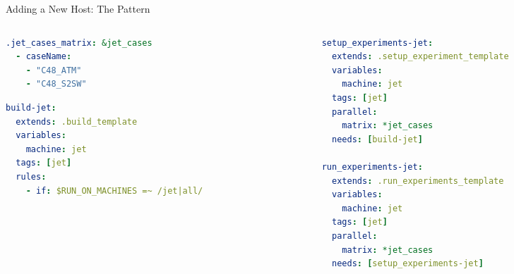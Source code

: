 \documentclass[aspectratio=169]{beamer}
\begin{document}
\begin{frame}[fragile]{Adding a New Host: The Pattern}

\begin{center}
\end{center}

\vspace{0.2cm}

\begin{columns}[T]
\begin{column}{0.48\textwidth}
\begin{lstlisting}[language=yaml,basicstyle=\ttfamily\tiny,title={\small Step 1: Define case matrix}]
.jet_cases_matrix: &jet_cases
  - caseName:
    - "C48_ATM"
    - "C48_S2SW"
\end{lstlisting}

\begin{lstlisting}[language=yaml,basicstyle=\ttfamily\tiny,title={\small Step 2: Add build job}]
build-jet:
  extends: .build_template
  variables:
    machine: jet
  tags: [jet]
  rules:
    - if: $RUN_ON_MACHINES =~ /jet|all/
\end{lstlisting}
\end{column}

\begin{column}{0.48\textwidth}
\begin{lstlisting}[language=yaml,basicstyle=\ttfamily\tiny,title={\small Step 3: Add setup/run jobs}]
setup_experiments-jet:
  extends: .setup_experiment_template
  variables:
    machine: jet
  tags: [jet]
  parallel:
    matrix: *jet_cases
  needs: [build-jet]

run_experiments-jet:
  extends: .run_experiments_template
  variables:
    machine: jet
  tags: [jet]
  parallel:
    matrix: *jet_cases
  needs: [setup_experiments-jet]
\end{lstlisting}
\end{column}
\end{columns}

\vspace{0.2cm}
\begin{center}
\end{center}

\end{frame}
\end{document}
